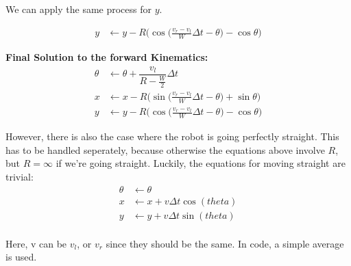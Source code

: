 \documentclass{article}
\begin{document}
We can apply the same process for $y$.

\begin{align}
  y &\leftarrow y-R\Bigg(\cos{\Big(\frac{v_r-v_l}{W}\Delta t-\theta\Big)}-\cos{\theta}\Bigg)
\end{align}

\textbf{Final Solution to the forward Kinematics:}
\begin{align}
 \theta &\leftarrow \theta + \dfrac{v_l}{R-\frac{W}{2}}\Delta t \\
  x &\leftarrow x-R\Bigg(\sin{\Big(\frac{v_r-v_l}{W}\Delta t-\theta\Big)}+\sin{\theta}\Bigg) \\
  y &\leftarrow y-R\Bigg(\cos{\Big(\frac{v_r-v_l}{W}\Delta t-\theta\Big)}-\cos{\theta}\Bigg)
\end{align}

However, there is also the case where the robot is going perfectly straight. This has to be handled seperately, because otherwise the equations above involve $R$, but $R=\infty$ if we're going straight. Luckily, the equations for moving straight are trivial:
\begin{align}
 \theta &\leftarrow \theta \\
  x &\leftarrow x + v\Delta t\cos(theta) \\
  y &\leftarrow y + v\Delta t\sin(theta) \\
\end{align}

Here, v can be $v_l$, or $v_r$ since they should be the same. In code, a simple average is used.
\end{document}
